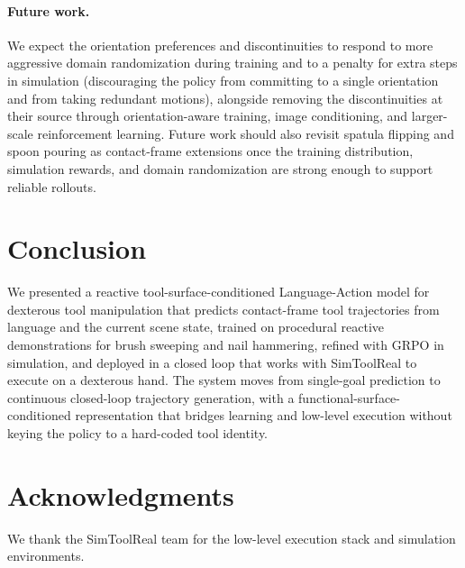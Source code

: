 \documentclass[11pt]{article}
\begin{document}
\paragraph{Future work.}
We expect the orientation preferences and discontinuities to respond to more aggressive domain randomization during training and to a penalty for extra steps in simulation (discouraging the policy from committing to a single orientation and from taking redundant motions), alongside removing the discontinuities at their source through orientation-aware training, image conditioning, and larger-scale reinforcement learning.
Future work should also revisit spatula flipping and spoon pouring as contact-frame extensions once the training distribution, simulation rewards, and domain randomization are strong enough to support reliable rollouts.

\section{Conclusion}

We presented a reactive tool-surface-conditioned Language-Action model for dexterous tool manipulation that predicts contact-frame tool trajectories from language and the current scene state, trained on procedural reactive demonstrations for brush sweeping and nail hammering, refined with GRPO in simulation, and deployed in a closed loop that works with SimToolReal to execute on a dexterous hand.
The system moves from single-goal prediction to continuous closed-loop trajectory generation, with a functional-surface-conditioned representation that bridges learning and low-level execution without keying the policy to a hard-coded tool identity.

\section*{Acknowledgments}

We thank the SimToolReal team for the low-level execution stack and simulation environments.



\end{document}
